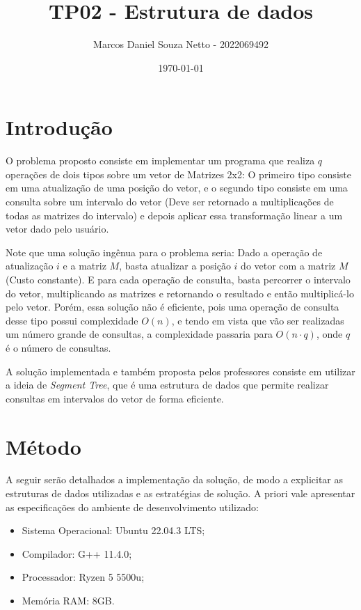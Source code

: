 \documentclass{article}
\title{TP02 - Estrutura de dados}
\author{Marcos Daniel Souza Netto - 2022069492}
\date{\today}
\begin{document}
\maketitle

\section{Introdução}

O problema proposto consiste em implementar um programa que realiza $q$ operações de dois tipos sobre um vetor de Matrizes 2x2: O primeiro tipo consiste em uma atualização de uma posição do vetor, e o segundo tipo consiste em uma consulta sobre um intervalo do vetor (Deve ser retornado a multiplicações de todas as matrizes do intervalo) e depois aplicar essa transformação linear a um vetor dado pelo usuário.

Note que uma solução ingênua para o problema seria: Dado a operação de atualização $i$ e a matriz $M$, basta atualizar a posição $i$ do vetor com a matriz $M$ (Custo constante). E para cada operação de consulta, basta percorrer o intervalo do vetor, multiplicando as matrizes e retornando o resultado e então multiplicá-lo pelo vetor. 
Porém, essa solução não é eficiente, pois uma operação de consulta desse tipo possui complexidade $O(n)$, e tendo em vista que vão ser realizadas um número grande de consultas, a complexidade passaria para $O(n \cdot q)$, onde $q$ é o número de consultas.

A solução implementada e também proposta pelos professores consiste em utilizar a ideia de \emph{Segment Tree}, que é uma estrutura de dados que permite realizar consultas em intervalos do vetor de forma eficiente. 

\section{Método}

A seguir serão detalhados a implementação da solução, de modo a explicitar 
as estruturas de dados utilizadas e as estratégias de solução. A priori vale 
apresentar as especificações do ambiente de desenvolvimento utilizado:

\begin{itemize}
    \item Sistema Operacional: Ubuntu 22.04.3 LTS;
    \item Compilador: G++ 11.4.0;
    \item Processador: Ryzen 5 5500u;
    \item Memória RAM: 8GB.
\end{itemize}
\end{document}

